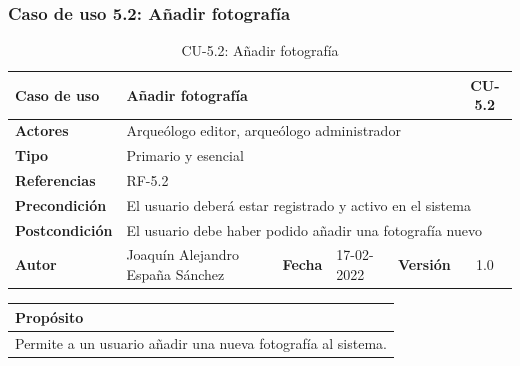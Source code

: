 \subsubsection{Caso de uso 5.2: Añadir fotografía}

    \begin{table}[H]
    \begin{center}
        \begin{adjustbox}{width=\textwidth}
        \begin{tabular}{ | l | l | l | l | c | c | } 
            \hline
            \textbf{Caso de uso} & \multicolumn{4}{l|}{Añadir fotografía} & \cellcolor{gray!50} \textbf{CU-5.2}\\
            \hline
            \textbf{Actores} & \multicolumn{5}{p{0.9\linewidth}|}{Arqueólogo editor, arqueólogo administrador} \\
            \hline
            \textbf{Tipo} & \multicolumn{5}{l|}{Primario y esencial} \\
            \hline
            \textbf{Referencias} & \multicolumn{3}{l|}{RF-5.2} & \multicolumn{2}{l|}{ }\\
            \hline
            \textbf{Precondición} & \multicolumn{5}{l|}{El usuario deberá estar registrado y activo en el sistema} \\
            \hline
            \textbf{Postcondición} & \multicolumn{5}{l|}{El usuario debe haber podido añadir una fotografía nuevo} \\
            \hline
            \textbf{Autor} & \multicolumn{1}{p{0.25\linewidth}|}{Joaquín Alejandro España Sánchez} & \textbf{Fecha} & 
            17-02-2022     & \textbf{Versión}                                                      & 1.0\\
            \hline
        \end{tabular}
        \end{adjustbox}
        \caption{CU-5.2: Añadir fotografía}
        \label{tab:add-photo}
    \end{center}
    \end{table}

    \begin{table}[H]
        \centering
        \begin{tabularx}{\textwidth}{@{} |L |@{}} \hline
            \textbf{Propósito} \\
            \hline
            Permite a un usuario añadir una nueva fotografía al sistema. \\
            \hline
        \end{tabularx}
    \end{table}

